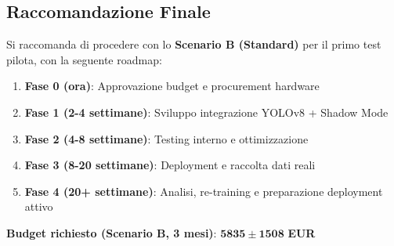 \documentclass[a4paper,11pt]{article}
\begin{document}
\subsection{Raccomandazione Finale}

Si raccomanda di procedere con lo \textbf{Scenario B (Standard)} per il primo test pilota, con la seguente roadmap:

\begin{enumerate}
    \item \textbf{Fase 0 (ora)}: Approvazione budget e procurement hardware
    \item \textbf{Fase 1 (2-4 settimane)}: Sviluppo integrazione YOLOv8 + Shadow Mode
    \item \textbf{Fase 2 (4-8 settimane)}: Testing interno e ottimizzazione
    \item \textbf{Fase 3 (8-20 settimane)}: Deployment e raccolta dati reali
    \item \textbf{Fase 4 (20+ settimane)}: Analisi, re-training e preparazione deployment attivo
\end{enumerate}

\vspace{1cm}
\begin{center}
    \textbf{Budget richiesto (Scenario B, 3 mesi)}: $\mathbf{5835 \pm 1508}$ \textbf{EUR}
\end{center}
\end{document}
